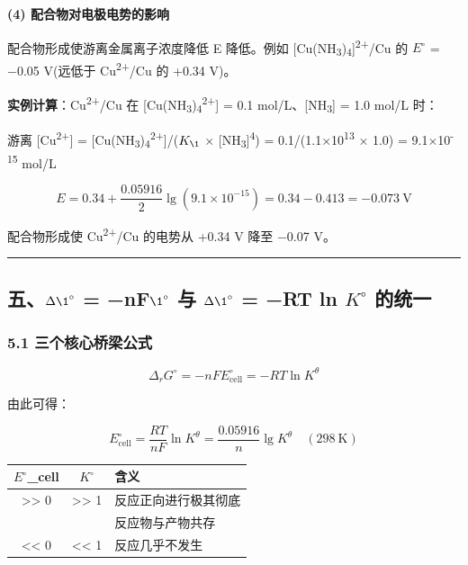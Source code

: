 \textbf{(4) 配合物对电极电势的影响}

配合物形成使游离金属离子浓度降低 \箭 E 降低。例如 {[}Cu(NH\textsubscript{3})\textsubscript{4}{]}\textsuperscript{2+}/Cu 的 \(E^{\circ}\) = −0.05 V(远低于 Cu\textsuperscript{2+}/Cu 的 +0.34 V)。

\textbf{实例计算}：Cu\textsuperscript{2+}/Cu 在 {[}Cu(NH\textsubscript{3})\textsubscript{4}\textsuperscript{2+}{]} = 0.1 mol/L、{[}NH\textsubscript{3}{]} = 1.0 mol/L 时：

游离 {[}Cu\textsuperscript{2+}{]} = {[}Cu(NH\textsubscript{3})\textsubscript{4}\textsuperscript{2+}{]}/(\(K_{\1}\) × {[}NH\textsubscript{3}{]}\textsuperscript{4}) = 0.1/(1.1×10\textsuperscript{13} × 1.0) = 9.1×10\textsuperscript{-15} mol/L

\[E = 0.34 + \frac{0.05916}{2}\lg(9.1\times10^{-15}) = 0.34 - 0.413 = -0.073\ \mathrm{V}\]

配合物形成使 Cu\textsuperscript{2+}/Cu 的电势从 +0.34 V 降至 −0.07 V。

\begin{center}\rule{0.5\linewidth}{0.5pt}\end{center}

\subsection{\texorpdfstring{五、\(\Delta \1^{\circ}\) = −nF\(\1^{\circ}\) 与 \(\Delta \1^{\circ}\) = −RT ln \(K^{\circ}\) 的统一}{五、\textbackslash Delta \textbackslash1\^{}\{\textbackslash circ\} = −nF\textbackslash1\^{}\{\textbackslash circ\} 与 \textbackslash Delta \textbackslash1\^{}\{\textbackslash circ\} = −RT ln K\^{}\{\textbackslash circ\} 的统一}}\label{ux4e94delta-1circ-nf1circ-ux4e0e-delta-1circ-rt-ln-kcirc-ux7684ux7edfux4e00}

\subsubsection{5.1 三个核心桥梁公式}\label{ux4e09ux4e2aux6838ux5fc3ux6865ux6881ux516cux5f0f}

\[
\boxed{\Delta_rG^\circ = -nFE^\circ_{\text{cell}} = -RT\ln K^\theta}
\]

由此可得：

\[
E^\circ_{\text{cell}} = \frac{RT}{nF}\ln K^\theta = \frac{0.05916}{n}\lg K^\theta \quad (298\ \mathrm{K})
\]

{\def\LTcaptype{none} %
\begin{longtable}[]{@{}ccl@{}}
\toprule\noalign{}
\(E^{\circ}\)\_cell & \(K^{\circ}\) & 含义 \\
\midrule\noalign{}
\endhead
\bottomrule\noalign{}
\endlastfoot
\textgreater\textgreater{} 0 & \textgreater\textgreater{} 1 & 反应正向进行极其彻底 \\
 0 &  1 & 反应物与产物共存 \\
\textless\textless{} 0 & \textless\textless{} 1 & 反应几乎不发生 \\
\end{longtable}
}

